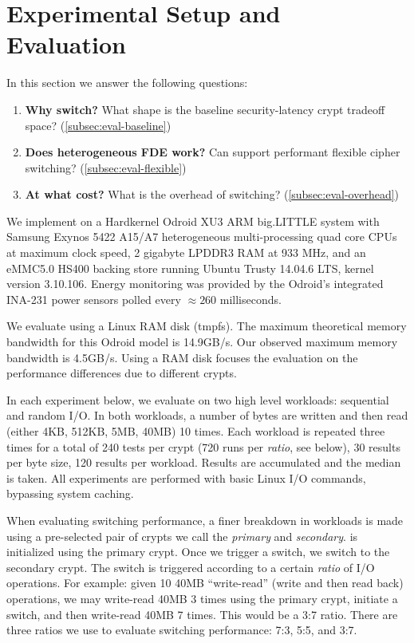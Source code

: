 \section{Experimental Setup and Evaluation}\label{sec:eval}

In this section we answer the following questions:

\begin{enumerate}
 \item {\bf Why switch?} What shape is the baseline security-latency crypt
 tradeoff space? (\cref{subsec:eval-baseline})
 \item {\bf Does heterogeneous FDE work?} Can \sys support performant flexible
 cipher switching? (\cref{subsec:eval-flexible})
 \item {\bf At what cost?} What is the overhead of switching?
 (\cref{subsec:eval-overhead})
\end{enumerate}

 We implement \sys on a Hardkernel Odroid XU3 ARM
big.LITTLE system with Samsung Exynos 5422 A15/A7 heterogeneous multi-processing
quad core CPUs at maximum clock speed, 2 gigabyte LPDDR3 RAM at 933 MHz, and an
eMMC5.0 HS400 backing store running Ubuntu Trusty 14.04.6 LTS, kernel version
3.10.106. Energy monitoring was provided by the Odroid's integrated INA-231
power sensors polled every $\approx{260}$ milliseconds.

We evaluate \sys using a Linux RAM disk (tmpfs). The maximum theoretical memory
bandwidth for this Odroid model is 14.9GB/s\@. Our observed maximum memory
bandwidth is 4.5GB/s. Using a RAM disk focuses the evaluation on the performance
differences due to different crypts.

 In each experiment below, we evaluate \sys on two high
level workloads: sequential and random I/O. In both workloads, a number of bytes
are written and then read (either 4KB, 512KB, 5MB, 40MB) 10 times. Each workload
is repeated three times for a total of 240 tests per crypt (720 runs per {\em
ratio}, see below), 30 results per byte size, 120 results per workload. Results
are accumulated and the median is taken. All experiments are performed with
basic Linux I/O commands, bypassing system caching.

When evaluating switching performance, a finer breakdown in workloads is made
using a pre-selected pair of crypts we call the {\em primary} and {\em
secondary}. \sys is initialized using the primary crypt. Once we trigger a
switch, we switch to the secondary crypt. The switch is triggered according to a
certain {\em ratio} of I/O operations. For example: given 10 40MB ``write-read''
(write and then read back) operations, we may write-read 40MB 3 times using the
primary crypt, initiate a switch, and then write-read 40MB 7 times. This would
be a 3:7 ratio. There are three ratios we use to evaluate switching performance:
7:3, 5:5, and 3:7.


